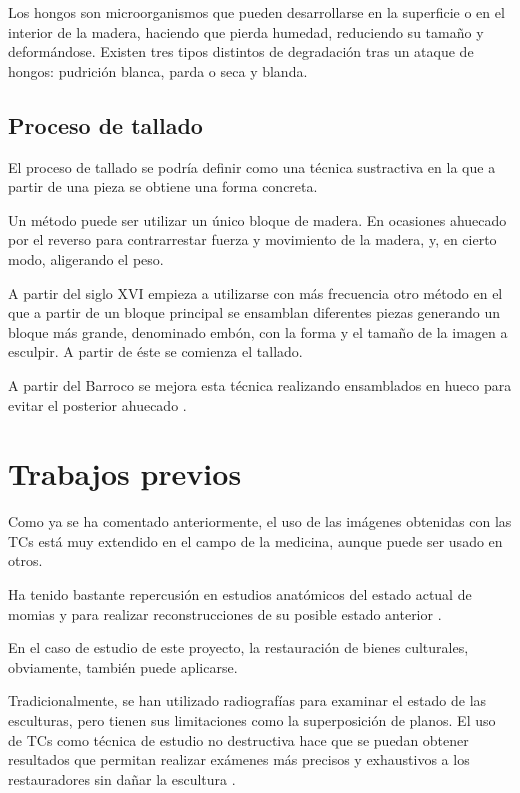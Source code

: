 Los hongos son microorganismos que pueden desarrollarse en la superficie o en el interior de la madera, haciendo que pierda humedad, reduciendo su tamaño y deformándose. Existen tres tipos distintos de degradación tras un ataque de hongos: pudrición blanca, parda o seca y blanda.

\subsection{Proceso de tallado}

El proceso de tallado se podría definir como una técnica sustractiva en la que a partir de una pieza se obtiene una forma concreta.

Un método puede ser utilizar un único bloque de madera. En ocasiones ahuecado por el reverso para contrarrestar fuerza y movimiento de la madera, y, en cierto modo, aligerando el peso.

A partir del siglo XVI empieza a utilizarse con más frecuencia otro método en el que a partir de un bloque principal se ensamblan diferentes piezas generando un bloque más grande, denominado embón, con la forma y el tamaño de la imagen a esculpir. A partir de éste se comienza el tallado.

A partir del Barroco se mejora esta técnica realizando ensamblados en hueco para evitar el posterior ahuecado \cite{tc_esculturas}.

\section{Trabajos previos}

Como ya se ha comentado anteriormente, el uso de las imágenes obtenidas con las TCs está muy extendido en el campo de la medicina, aunque puede ser usado en otros. 

Ha tenido bastante repercusión en estudios anatómicos del estado actual de momias \cite{mummies} y para realizar reconstrucciones de su posible estado anterior \cite{mummies_reconstruction}.

En el caso de estudio de este proyecto, la restauración de bienes culturales, obviamente, también puede aplicarse.

Tradicionalmente, se han utilizado radiografías para examinar el estado de las esculturas, pero tienen sus limitaciones como la superposición de planos. El uso de TCs como técnica de estudio no destructiva hace que se puedan obtener resultados que permitan realizar exámenes más precisos y exhaustivos a los restauradores sin dañar la escultura \cite{tc_esculturas}.


